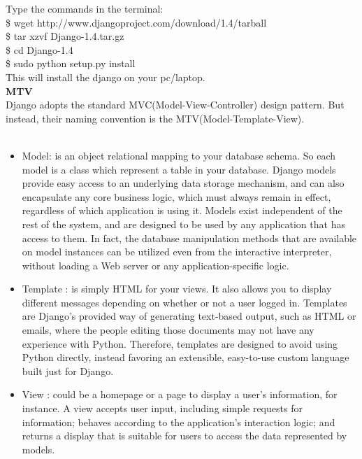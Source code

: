 Type the commands in the terminal:\\

 \$ wget http://www.djangoproject.com/download/1.4/tarball\\


 \$ tar xzvf Django-1.4.tar.gz\\


 \$ cd Django-1.4\\


 \$ sudo python setup.py install \\

This will install the django on your pc/laptop.\\
 
{\bf MTV}\\
Django adopts the standard MVC(Model-View-Controller) design pattern. But instead, their naming convention is the MTV(Model-Template-View).\\\\
\begin{itemize}
\item Model: is an object relational mapping to your database schema. So each model is a class which represent a table in your database. Django models provide easy access to an underlying data storage mechanism, and can also encapsulate any core business logic, which must always remain in effect, regardless of which application is using it. Models exist independent of the rest of the system, and are designed to be used by any application that has access to them. In fact, the database manipulation methods that are available on model instances can be utilized even from the interactive interpreter, without loading a Web server or any application-specific logic.

\item Template : is simply HTML for your views. It also allows you to display different messages depending on whether or not a user logged in. Templates are Django’s provided way of generating text-based output, such as HTML or emails, where the people editing those documents may not have any experience with Python. Therefore, templates are designed to avoid using Python directly, instead favoring an extensible, easy-to-use custom language built just
for Django.

\item View : could be a homepage or a page to display a user's information, for instance. A view accepts user input, including simple requests for information; behaves according to the application’s interaction logic; and returns a display that is suitable for users to access the data represented by models.

\end{itemize}
